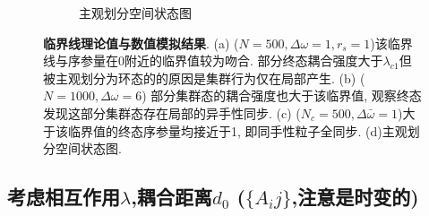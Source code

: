 \documentclass{article}
\begin{document}
\begin{figure}[H]
\begin{subfigure}[b]{0.49\textwidth}
		\vspace{-1cm}
		\caption{主观划分空间状态图}
	\end{subfigure}
	\vspace{-0.3cm}
	\caption{\small\textbf{临界线理论值与数值模拟结果}. (a) ($N=500, \Delta \omega=1, r_s=1$)该临界线与序参量在0附近的临界值较为吻合. 部分终态耦合强度大于$\lambda_{c1}$但被主观划分为环态的的原因是集群行为仅在局部产生. (b) ($N=1000, \Delta \omega=6$) 部分集群态的耦合强度也大于该临界值, 观察终态发现这部分集群态存在局部的异手性同步. (c) ($N_c=500, \Delta \bar{\omega}=1$)大于该临界值的终态序参量均接近于1, 即同手性粒子全同步. (d)主观划分空间状态图.}
	\label{fig:fig23.3}
\end{figure}


\newpage






\subsection{考虑相互作用$\lambda$,耦合距离$d_0$ ($\{A_ij\}$,注意是时变的)}
\end{document}
